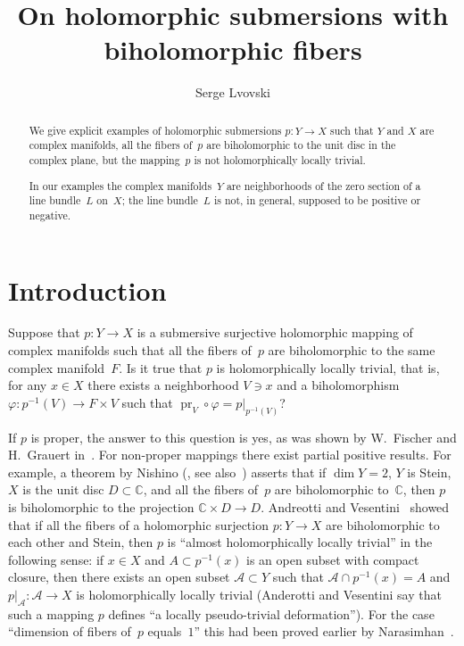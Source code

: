 \documentclass[11pt]{amsart}
\author{Serge Lvovski}
\title{On holomorphic submersions with biholomorphic fibers}
\newcommand*{\C}{{\mathbb C}}
\DeclareMathOperator{\pr}{pr}
\let\ph\varphi
\theoremstyle{remark}
\theoremstyle{definition}
\begin{document}


\begin{abstract}
We give explicit examples of holomorphic submersions $p\colon Y\to
X$ such that $Y$ and $X$ are complex manifolds, all the fibers
of~$p$ are biholomorphic to the unit disc in the complex plane, but the
mapping~$p$ is not holomorphically locally trivial.

In our examples the complex manifolds~$Y$ are neighborhoods of the
zero section of a line bundle~$L$ on~$X$; the line bundle~$L$ is
not, in general, supposed to be positive or negative.
\end{abstract}

\maketitle

\section{Introduction}

Suppose that $p\colon Y\to X$ is a submersive surjective holomorphic
mapping of complex manifolds such that all the fibers of~$p$ are
biholomorphic to the same complex manifold~$F$.  Is it true that $p$
is holomorphically locally trivial, that is, for any $x\in X$
there exists a neighborhood $V\ni x$ and a biholomorphism $\ph\colon
p^{-1}(V)\to F\times V$ such that
$\pr_V\circ\ph=p|_{p^{-1}(V)}$?

If $p$ is proper, the answer to this question is yes, as was shown by
W.~Fischer and H.~Grauert in~\cite{FischerGrauert}. For non-proper
mappings there exist partial positive results. For example, a theorem
by Nishino (\cite{Nishino}, see also~\cite{Ohsawa,Chirka}) asserts
that if $\dim Y=2$, $Y$ is Stein, $X$ is the unit disc $D\subset\C$,
and all the fibers of~$p$ are biholomorphic to~$\C$, then $p$ is
biholomorphic to the projection $\C\times D\to D$. Andreotti and
Vesentini~\cite{AV} showed that if all the fibers of a holomorphic
surjection $p\colon Y\to X$ are biholomorphic to each other and Stein,
then $p$ is ``almost holomorphically locally trivial'' in the
following sense: if $x\in X$ and $A\subset p^{-1}(x)$ is an open
subset with compact closure, then there exists an open subset
$\mathcal A\subset Y$ such that $\mathcal A\cap p^{-1}(x)=A $ and
$p|_{\mathcal A}\colon \mathcal A\to X$ is holomorphically locally
trivial (Anderotti and Vesentini say that such a mapping $p$ defines
``a locally pseudo-trivial deformation''). For the case ``dimension of
fibers of~$p$ equals~$1$'' this had been proved earlier by
Narasimhan~\cite{Narasimhan}.
\end{document}
